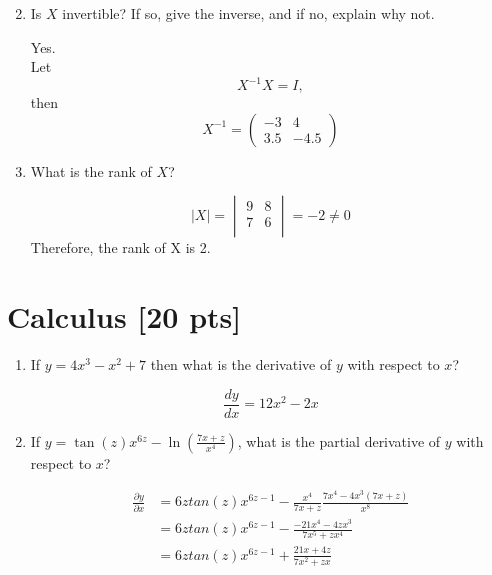 \documentclass[a4paper]{article}
\theoremstyle{definition}
\newenvironment{soln}{
    \leavevmode\color{blue}\ignorespaces
}{}
\begin{document}
\begin{enumerate}
\begin{soln}
$$	    $$  
	    \end{soln}
	\item 	Is $X$ invertible? If so, give the inverse, and if no, explain why not.\\
        \begin{soln}  
        Yes. \\
        Let $$
        X^{-1}X = I,
        $$
        then $$
        X^{-1} = \begin{pmatrix}
        -3 & 4 \\
        3.5 & -4.5
        \end{pmatrix}
        $$
        \end{soln}
	\item 	What is the rank of $X$?\\
	    \begin{soln}  
	    $$
	    |X| = \begin{vmatrix}
	    9 & 8 \\
	    7 & 6 \\
	    \end{vmatrix}
	    = -2 \neq 0
	    $$
	    Therefore, the rank of X is 2.
	    \end{soln}
\end{enumerate}


\section{Calculus [20 pts]}
\begin{enumerate}
	\item 	If $y = 4x^3 - x^2 + 7$ then what is the derivative of $y$ with respect to $x$?\\
	\begin{soln}
	$$
	\frac{dy}{dx} = 12x^{2} - 2x
	$$
	\end{soln}
	\item If $y = \tan(z)x^{6z} - \ln(\frac{7x + z}{x^{4}})$, what is the partial derivative of $y$ with respect to $x$?\\
	\begin{soln}
	\begin{equation*}
	\begin{aligned}
	\frac{\partial y}{\partial x} &= 6ztan(z)x^{6z-1} - \frac{x^{4}}{7x+z}\frac{7x^4-4x^3(7x+z)}{x^8} \\
	                                        &= 6ztan(z)x^{6z-1} - \frac{-21x^4-4zx^3}{7x^5+zx^4} \\
	                                        &= 6ztan(z)x^{6z-1} + \frac{21x+4z}{7x^2+zx}
	\end{aligned}
	\end{equation*}
	\end{soln}
\end{enumerate}
\end{document}
